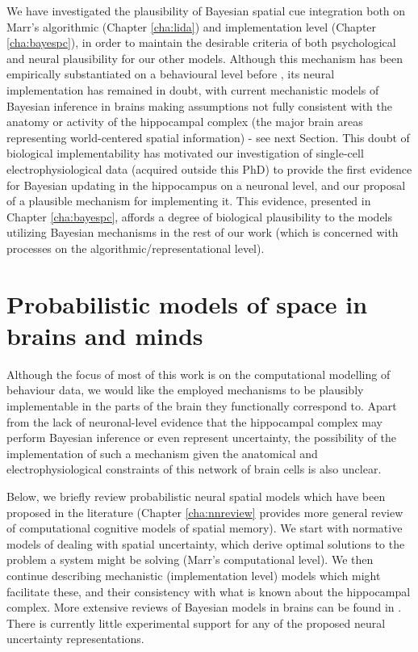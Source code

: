We have investigated the plausibility of Bayesian spatial cue integration both on Marr's algorithmic (Chapter \ref{cha:lida}) and implementation level (Chapter \ref{cha:bayespc}), in order to maintain the desirable criteria of both psychological and neural plausibility for our other models. Although this mechanism has been empirically substantiated on a behavioural level before \citep{cheng2007bayesian, nardini2008development}, its neural implementation has remained in doubt, with current mechanistic models of Bayesian inference in brains making assumptions not fully consistent with the anatomy or activity of the hippocampal complex (the major brain areas representing world-centered spatial information) - see next Section. This doubt of biological implementability has motivated our investigation of single-cell electrophysiological data (acquired outside this PhD) to provide the first evidence for Bayesian updating in the hippocampus on a neuronal level, and our proposal of a plausible mechanism for implementing it. This evidence, presented in Chapter \ref{cha:bayespc}, affords a degree of biological plausibility to the models utilizing Bayesian mechanisms in the rest of our work (which is concerned with processes on the algorithmic/representational level).


\section{Probabilistic models of space in brains and minds}
\label{sec:intro:uncertaintybrain} 

Although the focus of most of this work is on the computational modelling of behaviour data, we would like the employed mechanisms to be plausibly implementable in the parts of the brain they functionally correspond to. Apart from the lack of neuronal-level evidence that the hippocampal complex may perform Bayesian inference or even represent uncertainty, the possibility of the implementation of such a mechanism given the anatomical and electrophysiological constraints of this network of brain cells is also unclear. 

Below, we briefly review probabilistic neural spatial models which have been proposed in the literature (Chapter \ref{cha:nnreview} provides more general review of computational cognitive models of spatial memory). We start with normative models of dealing with spatial uncertainty, which derive optimal solutions to the problem a system might be solving (Marr's computational level). We then continue describing mechanistic (implementation level) models which might facilitate these, and their consistency with what is known about the hippocampal complex. More extensive reviews of Bayesian models in brains can be found in \citep{pouget2013probabilistic, vilares2011bayesian}. There is currently little experimental support for any of the proposed neural uncertainty representations. %


